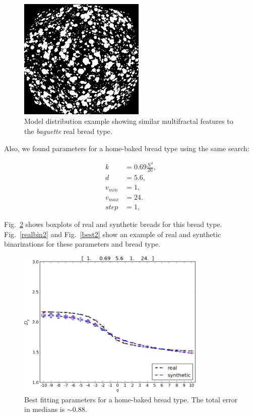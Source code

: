 \documentclass[spanish,a4paper,openright,11pt]{book}
\begin{document}
\begin{figure}[!ht]
\begin{center}
\includegraphics[width=6cm]{figures/best}
\caption{Model distribution example showing similar multifractal features to the {\em baguette} real bread type.}
\label{best}
\end{center}
\end{figure}

Also, we found parameters for a home-baked bread type using the same search:

\begin{align*}
k &= 0.69 \frac{N^{3}}{20} ,\\
d &=5.6,\\
v_{min} &=1,\\
v_{max} &=24.\\
step &=1,
\end{align*}

Fig.~\ref{bestboxplot2} shows boxplots of real and synthetic breads for this bread type. Fig.~\ref{realbin2} and  Fig.~\ref{best2} show an example of real and synthetic binarizations for these parameters and bread type. 


\begin{figure}[!ht]
\includegraphics[width=9cm]{figures/bestboxplot2}
\caption{Best fitting parameters for a home-baked bread type. The total error in medians is $\sim 0.88$.}
\label{bestboxplot2}
\end{figure}
\end{document}
